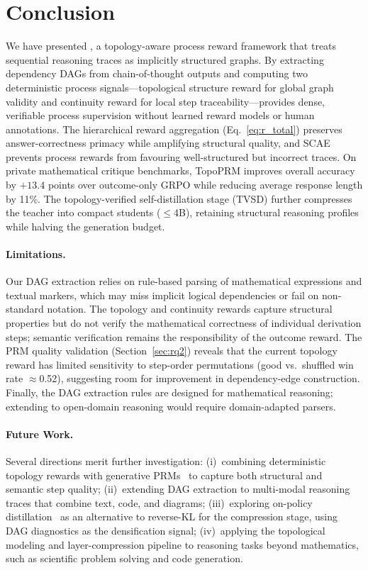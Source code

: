 \section{Conclusion}
\label{sec:conclusion}

We have presented \methodname, a topology-aware process reward framework that treats sequential reasoning traces as implicitly structured graphs.
By extracting dependency DAGs from chain-of-thought outputs and computing two deterministic process signals---topological structure reward for global graph validity and continuity reward for local step traceability---\methodname provides dense, verifiable process supervision without learned reward models or human annotations.
The hierarchical reward aggregation (Eq.~\ref{eq:r_total}) preserves answer-correctness primacy while amplifying structural quality, and SCAE prevents process rewards from favouring well-structured but incorrect traces.
On private mathematical critique benchmarks, TopoPRM improves overall accuracy by $+13.4$ points over outcome-only GRPO while reducing average response length by 11\%.
The topology-verified self-distillation stage (TVSD) further compresses the teacher into compact students ($\leq$4B), retaining structural reasoning profiles while halving the generation budget.

\paragraph{Limitations.}
Our DAG extraction relies on rule-based parsing of mathematical expressions and textual markers, which may miss implicit logical dependencies or fail on non-standard notation.
The topology and continuity rewards capture structural properties but do not verify the mathematical correctness of individual derivation steps; semantic verification remains the responsibility of the outcome reward.
The PRM quality validation (Section~\ref{sec:rq2}) reveals that the current topology reward has limited sensitivity to step-order permutations (good vs.\ shuffled win rate $\approx$0.52), suggesting room for improvement in dependency-edge construction.
Finally, the DAG extraction rules are designed for mathematical reasoning; extending to open-domain reasoning would require domain-adapted parsers.

\paragraph{Future Work.}
Several directions merit further investigation:
(i)~combining deterministic topology rewards with generative PRMs~\citep{genprm2026,thinkprm2025} to capture both structural and semantic step quality;
(ii)~extending DAG extraction to multi-modal reasoning traces that combine text, code, and diagrams;
(iii)~exploring on-policy distillation~\citep{agarwal2024gkd,opsdc2026} as an alternative to reverse-KL for the compression stage, using DAG diagnostics as the densification signal;
(iv)~applying the topological modeling and layer-compression pipeline to reasoning tasks beyond mathematics, such as scientific problem solving and code generation.
